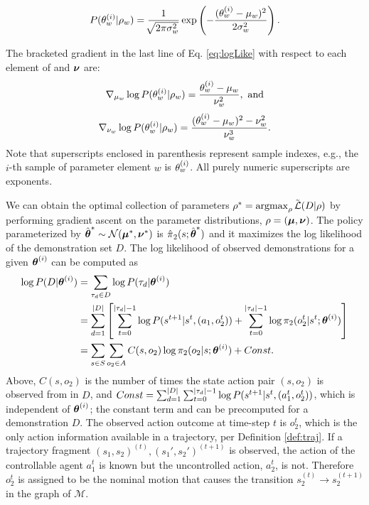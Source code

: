     \[
        P(\theta_{w}^{(i)} | \rho_{w}) =  \frac{1}{\sqrt[]{2\pi \sigma_w^2}}\exp \left( -
        \frac{(\theta_w^{(i)}-\mu_w)^2}{2\sigma_w^2} \right).
    \]

    The bracketed gradient in the last line of Eq. \ref{eq:logLike} with respect to each element of \vect{\mu} and
    $\boldsymbol{\mathbb{\nu}}$ are:
    \[
    \nabla_{\mu_{\paramIdx}}\log P(\paramElem^{(i)} | \rho_{\paramIdx}) =
        \frac{\paramElem^{(i)} - \mu_{\paramIdx}}{\nu_{\paramIdx}^2},\ \text{and}
    \]
    \[
    \nabla_{\nu_{w}}\log P(\theta_{w}^{(i)} | \rho_{w}) = \frac{(\theta_{w}^{(i)} - \mu_{w})^2 -
        \nu_{w}^2}{\nu_{w}^3}.
    \]
    Note that superscripts enclosed in parenthesis represent sample indexes, e.g., the $i$-th sample of parameter
    element $w$ is $\theta_{w}^{(i)}$. All purely numeric superscripts are exponents.


    We can obtain the optimal collection of parameters $\rho^*= \mathop{\mathrm{argmax}}_{\rho} \tilde{\mathcal{L}{}}(D|\rho)$ by
    performing gradient ascent on the parameter distributions, $\rho = (\boldsymbol{\mathbb{\mu}}, \boldsymbol{\mathbb{\nu}})$. The policy
    parameterized by $\hat{\boldsymbol{\mathbb{\theta}}}^* \sim \mathcal{N}(\boldsymbol{\mathbb{\mu}}^*, \boldsymbol{\mathbb{\nu}}^*)$ is
    $\hat{\pi_{}}_{2}(s; \hat{\boldsymbol{\mathbb{\theta}}}^*)$ and it maximizes the log likelihood of the
    demonstration set $D$. The log likelihood of observed demonstrations for a given $\boldsymbol{\mathbb{\theta}}^{(i)}$ can be computed
    as
    \begin{align*}
        \log P(D|\boldsymbol{\mathbb{\theta}}^{(i)}) & = \sum_{\tau_d \in D} \log P(\tau_d |\boldsymbol{\mathbb{\theta}}^{(i)})\\
        & = \sum_{d=1}^{\lvert D\rvert} \left[ \sum_{t=0}^{\lvert\tau_d\rvert-1} \log P(s^{t+1}|s^t,(a_1, o_2^t)) +
            \sum_{t=0}^{\lvert\tau_d\rvert-1}  \log \pi_{2}(o_2^t|s^t; \boldsymbol{\mathbb{\theta}}^{(i)}) \right]\\
        & = \sum_{s\in S}\sum_{o_2\in A} C(s, o_2)  \log \pi_{2}(o_2|s; \boldsymbol{\mathbb{\theta}}^{(i)}) + Const.
            \end{align*}
    Above, $C(s, o_2)$ is the number of times the state action pair $(s,o_2)$ is observed from in $D$, and
    $Const =\sum_{d=1}^{\lvert D\rvert} \sum_{t=0}^{\lvert\tau_d\rvert-1} \log P(s^{t+1}|s^t,(a_1^t,o_2^t))$, which is independent of
    $\boldsymbol{\mathbb{\theta}}^{(i)}$; the constant term and can be precomputed for a demonstration $D$. The observed action outcome at
    time-step $t$ is $o_2^t$, which is the only action information available in a trajectory, per Definition
    \ref{def:traj}.  If a trajectory fragment $(s_1, s_2)^{(t)}, (s_1', s_2')^{(t+1)}$ is observed, the action of the
    controllable agent $a_1^t$ is known but the uncontrolled action, $a_2^t$, is not.  Therefore $o_2^t$ is assigned to
    be the nominal motion that causes the transition $s_2^{(t)} \rightarrow s_2^{(t+1)}$ in the graph of $\mathcal{M}$.

